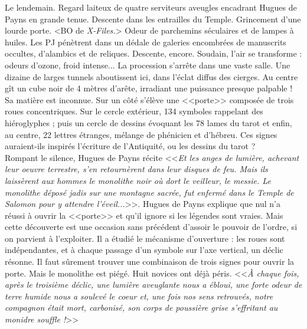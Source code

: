 \documentclass[11pt,twoside,a4paper]{book}
\begin{document}
Le lendemain. Regard laiteux de quatre serviteurs aveugles encadrant Hugues de Payns en grande tenue. Descente dans les entrailles du Temple. Grincement d'une lourde porte. <BO de \emph{X-Files.}> Odeur de parchemins s{\'e}culaires et de lampes {\`a} huiles. Les PJ p{\'e}n{\`e}trent dans un d{\'e}dale de galeries encombr{\'e}es de manuscrits occultes, d'alambics et de reliques. Descente, encore. Soudain, l'air se transforme : odeurs d'ozone, froid intense... La procession s'arr{\^e}te dans une vaste salle. Une dizaine de larges tunnels aboutissent ici, dans l'{\'e}clat diffus des cierges. Au centre g{\^i}t un cube noir de 4 m{\`e}tres d'ar{\^e}te, irradiant une puissance presque palpable ! Sa mati{\`e}re est inconnue. Sur un c{\^o}t{\'e} s'{\'e}l{\`e}ve une <<porte>> compos{\'e}e de trois roues concentriques. Sur le cercle ext{\'e}rieur, 134 symboles rappelant des hi{\'e}roglyphes ; puis un cercle de dessins {\'e}voquant les 78 lames du tarot et enfin, au centre, 22 lettres {\'e}tranges, m{\'e}lange de ph{\'e}nicien et d'h{\'e}breu. Ces signes auraient-ils inspir{\'e}s l'{\'e}criture de l'Antiquit{\'e}, ou les dessins du tarot ?~\\

Rompant le silence, Hugues de Payns r{\'e}cite <<\emph{Et les anges de lumi{\`e}re, achevant leur oeuvre terrestre, s'en retourn{\`e}rent dans leur disques de feu. Mais ils laiss{\`e}rent aux hommes le monolithe noir o{\`u} dort le veilleur, le messie. Le monolithe d{\'e}pos{\'e} jadis sur une montagne sacr{\'e}e, fut enferm{\'e} dans le Temple de Salomon pour y attendre l'{\'e}veil...}>>. Hugues de Payns explique que nul n'a r{\'e}ussi {\`a} ouvrir la <<porte>> et qu'il ignore si les l{\'e}gendes sont vraies. Mais cette d{\'e}couverte est une occasion sans pr{\'e}c{\'e}dent d'assoir le pouvoir de l'ordre, si on parvient {\`a} l'exploiter. Il a {\'e}tudi{\'e} le m{\'e}canisme d'ouverture : les roues sont ind{\'e}pendantes, et {\`a} chaque passage d'un symbole sur l'axe vertical, un d{\'e}clic r{\'e}sonne. Il faut s{\^u}rement trouver une combinaison de trois signes pour ouvrir la porte. Mais le monolithe est pi{\'e}g{\'e}. Huit novices ont d{\'e}j{\`a} p{\'e}ris. <<\emph{{\`A} chaque fois, apr{\`e}s le troisi{\`e}me d{\'e}clic, une lumi{\`e}re aveuglante nous a {\'e}bloui, une forte odeur de terre humide nous a soulev{\'e} le coeur et, une fois nos sens retrouv{\'e}s, notre compagnon {\'e}tait mort, carbonis{\'e}, son corps de poussi{\`e}re grise s'effritant au monidre souffle !}>>~\\
\end{document}
